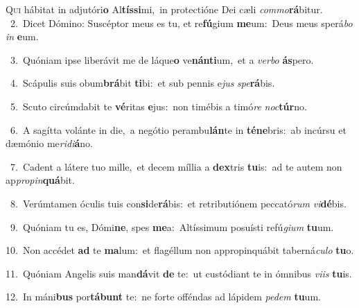 \lettrine{\initial\textcolor{\initialcolor}{Q}}{ui} hábitat in adjutóri\textbf{o} Al\-\textbf{tís}\-\textbf{si}mi,~\star in protectióne Dei cæli \textit{com}\-\textit{mo}\textbf{rá}bitur.\\
{\numbfont\textcolor{\numbcolor}{~2.}}~Dicet Dómino: Suscéptor meus es tu, et re\-\textbf{fú}\-gium \textbf{me}\-um:~\star Deus meus sperá\textit{bo} \textit{in} \textbf{e}\-um.\par
{\numbfont\textcolor{\numbcolor}{~3.}}~Quóniam ipse liberávit me de láque\textbf{o} ve\-\textbf{nán}\-\textbf{ti}um,~\star et a \textit{ver}\-\textit{bo} \textbf{ás}\-pero.\par
{\numbfont\textcolor{\numbcolor}{~4.}}~Scápulis suis obum\-\textbf{brá}\-bit \textbf{ti}\-bi:~\star et sub pennis e\textit{jus} \textit{spe}\-\textbf{rá}bis.\par
{\numbfont\textcolor{\numbcolor}{~5.}}~Scuto circúmdabit te \textbf{vé}\-ritas \textbf{e}\-jus:~\star non timébis a timó\textit{re} \textit{noc}\-\textbf{túr}no.\par
{\numbfont\textcolor{\numbcolor}{~6.}}~A sagítta volánte in die,~\dagger a negótio perambu\-\textbf{lán}\-te in \textbf{té}\-\textbf{ne}bris:~\star ab incúrsu et dæmónio me\-\textit{ri}\-\textit{di}\textbf{á}no.\par
{\numbfont\textcolor{\numbcolor}{~7.}}~Cadent a látere tuo mille,~\dagger et decem míllia a \textbf{dex}\-tris \textbf{tu}\-is:~\star ad te autem non ap\-\textit{pro}\-\textit{pin}\textbf{quá}bit.\par
{\numbfont\textcolor{\numbcolor}{~8.}}~Verúmtamen óculis tuis con\-\textbf{si}\-de\-\textbf{rá}\-bis:~\star et retributiónem peccató\textit{rum} \textit{vi}\-\textbf{dé}bis.\par
{\numbfont\textcolor{\numbcolor}{~9.}}~Quóniam tu es, Dómi\-\textbf{ne}\-, spes \textbf{me}\-a:~\star Altíssimum posuísti refú\-\textit{gi}\-\textit{um} \textbf{tu}\-um.\par
{\numbfont\textcolor{\numbcolor}{10.}}~Non accédet \textbf{ad} te \textbf{ma}\-lum:~\star et flagéllum non appropinquábit taberná\-\textit{cu}\-\textit{lo} \textbf{tu}\-o.\par
{\numbfont\textcolor{\numbcolor}{11.}}~Quóniam Angelis suis man\-\textbf{dá}\-vit \textbf{de} te:~\star ut custódiant te in ómnibus \textit{vi}\-\textit{is} \textbf{tu}\-is.\par
{\numbfont\textcolor{\numbcolor}{12.}}~In máni\textbf{bus} por\-\textbf{tá}\-\textbf{bunt} te:~\star ne forte offéndas ad lápidem \textit{pe}\-\textit{dem} \textbf{tu}\-um.\par
